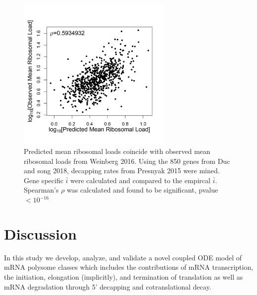 \documentclass[a4,center,fleqn]{NAR}
\newcommand\mmpar[1]{\marginpar{\begin{spacing}{0.7}\raggedright \singlespacing \tiny \textbf{M:} #1 \end{spacing}}}  %
\newcommand\rmpar[1]{\marginpar{\begin{spacing}{0.7}\raggedright \singlespacing \tiny \textbf{R:} #1 \end{spacing}}}  %
\newcommand{\MRL}{\ensuremath{\bar{i}}\xspace}
\begin{document}
\begin{figure}[!ht]
\begin{center}
\centering
\includegraphics[width=75mm]{Images/Duc_Song_vs_model_log.png}
\caption{Predicted mean ribosomal loads coincide with observed mean ribosomal loads from Weinberg 2016. Using the 850 genes from Duc and song 2018, decapping rates from Presnyak 2015 were mined. Gene specific \MRL were calculated and compared to the empircal \MRL. Spearman's $\rho$ was calculated and found to be significant, pvalue $<10^{-16}$}
\end{center}
\end{figure}



\section{Discussion}

In this study we develop, analyze, and validate a novel coupled ODE model of mRNA polysome classes %
which includes the contributions of mRNA transcription, the initiation, elongation (implicitly), and termination of translation as well as mRNA degradation through 5' decapping and cotranslational decay.
\end{document}
